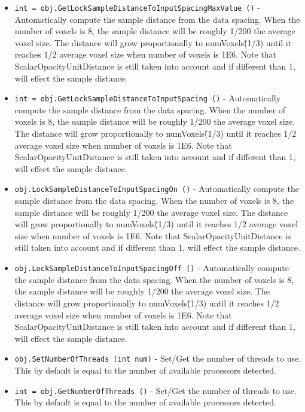 \begin{itemize}
\item  \verb|int = obj.GetLockSampleDistanceToInputSpacingMaxValue ()| -  Automatically compute the sample distance from the data spacing.  When
 the number of voxels is 8, the sample distance will be roughly 1/200
 the average voxel size. The distance will grow proportionally to
 numVoxels\^(1/3) until it reaches 1/2 average voxel size when number of
 voxels is 1E6. Note that ScalarOpacityUnitDistance is still taken into
 account and if different than 1, will effect the sample distance.

\item  \verb|int = obj.GetLockSampleDistanceToInputSpacing ()| -  Automatically compute the sample distance from the data spacing.  When
 the number of voxels is 8, the sample distance will be roughly 1/200
 the average voxel size. The distance will grow proportionally to
 numVoxels\^(1/3) until it reaches 1/2 average voxel size when number of
 voxels is 1E6. Note that ScalarOpacityUnitDistance is still taken into
 account and if different than 1, will effect the sample distance.

\item  \verb|obj.LockSampleDistanceToInputSpacingOn ()| -  Automatically compute the sample distance from the data spacing.  When
 the number of voxels is 8, the sample distance will be roughly 1/200
 the average voxel size. The distance will grow proportionally to
 numVoxels\^(1/3) until it reaches 1/2 average voxel size when number of
 voxels is 1E6. Note that ScalarOpacityUnitDistance is still taken into
 account and if different than 1, will effect the sample distance.

\item  \verb|obj.LockSampleDistanceToInputSpacingOff ()| -  Automatically compute the sample distance from the data spacing.  When
 the number of voxels is 8, the sample distance will be roughly 1/200
 the average voxel size. The distance will grow proportionally to
 numVoxels\^(1/3) until it reaches 1/2 average voxel size when number of
 voxels is 1E6. Note that ScalarOpacityUnitDistance is still taken into
 account and if different than 1, will effect the sample distance.

\item  \verb|obj.SetNumberOfThreads (int num)| -  Set/Get the number of threads to use. This by default is equal to
 the number of available processors detected.

\item  \verb|int = obj.GetNumberOfThreads ()| -  Set/Get the number of threads to use. This by default is equal to
 the number of available processors detected.


\end{itemize}
